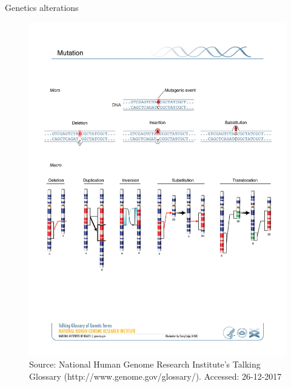\documentclass[slidestop,compress,11pt,xcolor=dvipsnames]{beamer}
\begin{document}
\begin{frame}{Genetics alterations}
\vspace*{-0.5cm}
 \begin{figure}
  \centering
  \includegraphics[width=0.9\linewidth]{intro/mutation.pdf}{\tiny{\\Source: National Human Genome Research Institute's Talking Glossary (http://www.genome.gov/glossary/). Accessed: 26-12-2017}}
 \end{figure}
\end{frame}

\end{document}
